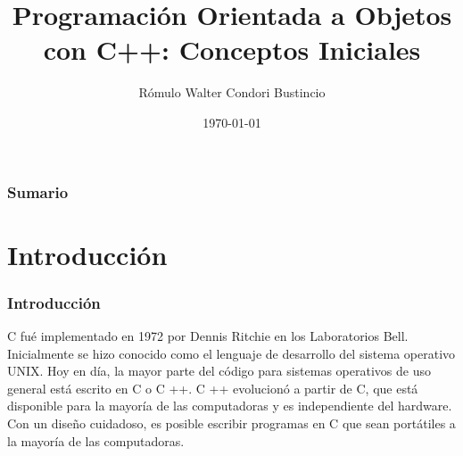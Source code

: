 \documentclass[xcolor=table]{beamer}
\title[Programación Orientada a Objetos con C++]{Programación Orientada a Objetos con C++: Conceptos Iniciales} %
\author{R\'omulo Walter Condori Bustincio} %
\institute[] %
{
UNSA, Arequipa, Per\'u \\ %
\medskip
\textit{ rcondorib@unsa.edu.pe} %
}
\date{\today} %
\begin{document}
\begin{frame}
\titlepage %
\end{frame}

\begin{frame}
\frametitle{Sumario} %
\tableofcontents %
\end{frame}

\section{Introducci\'on} 
\begin{frame}
\frametitle{Introducci\'on}
C fu\'e implementado en 1972 por Dennis Ritchie en los Laboratorios Bell. Inicialmente se hizo conocido como el lenguaje de desarrollo del sistema operativo UNIX. Hoy en día, la mayor parte del código para sistemas operativos de uso general está escrito en C o C ++. C ++ evolucionó a partir de C, que está disponible para la mayoría de las computadoras y es independiente del hardware. Con un diseño cuidadoso, es posible escribir programas en C que sean portátiles a la mayoría de las computadoras.
\end{frame}
\end{document}
